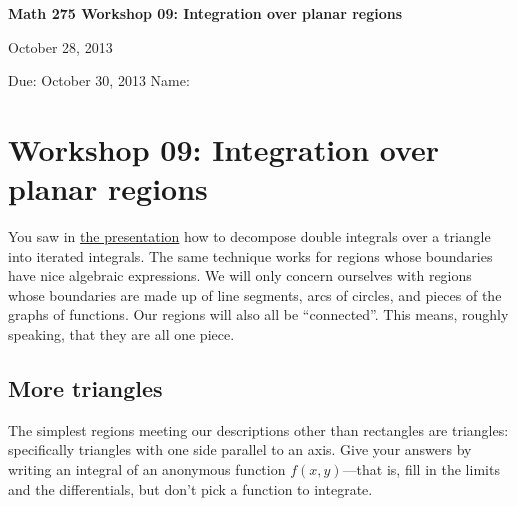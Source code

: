 \documentclass[12pt]{exam}
\theoremstyle{definition}
\begin{document}
\noindent
\textbf{{\large Math 275 \hfill Workshop 09: Integration over planar regions}}

\noindent
October 28, 2013 

\noindent
Due: October 30, 2013 \hfill Name: \underline{\hspace{3in}} 

\noindent

\section{Workshop 09: Integration over planar regions}

You saw in \href{../../decks/13/Deck.pdf}{the presentation} how to
decompose double integrals over a triangle into iterated integrals. The
same technique works for regions whose boundaries have nice algebraic
expressions. We will only concern ourselves with regions whose
boundaries are made up of line segments, arcs of circles, and pieces of
the graphs of functions. Our regions will also all be ``connected''.
This means, roughly speaking, that they are all one piece.

\subsection{More triangles}

The simplest regions meeting our descriptions other than rectangles are
triangles: specifically triangles with one side parallel to an axis.
Give your answers by writing an integral of an anonymous function
$f(x,y)$---that is, fill in the limits and the differentials, but don't
pick a function to integrate.
\end{document}

